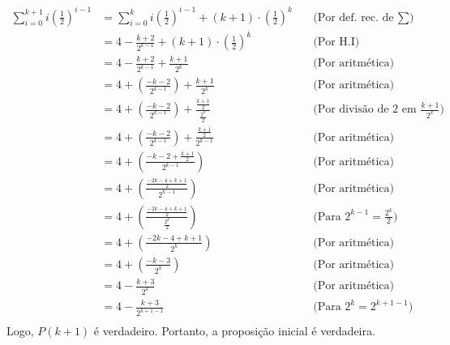 \begin{align*}
	\sum\limits_{i = 0}^{k + 1} i(\frac{1}{2})^{i - 1} & = \sum\limits_{i = 0}^k i(\frac{1}{2})^{i - 1} + (k + 1)\cdot(\frac{1}{2})^k & \quad \text{(Por def. rec. de $\sum$)}                   \\
	                                                   & = 4 - \frac{k + 2}{2^{k - 1}} + (k + 1) \cdot(\frac{1}{2})^k                 & \quad \text{(Por H.I)}                                   \\
	                                                   & = 4 - \frac{k + 2}{2^{k - 1}} + \frac{k + 1}{2^k}                            & \quad \text{(Por aritmética)}                                 \\
	                                                   & = 4 + (\frac{-k - 2}{2^{k - 1}}) + \frac{k + 1}{2^k}                         & \quad \text{(Por aritmética)}                                 \\
	                                                   & = 4 + (\frac{-k - 2}{2^{k - 1}}) + \frac{\frac{k + 1}{2}}{\frac{2^k}{2}}     & \quad \text{(Por divisão de $2$ em $\frac{k + 1}{2^k}$)} \\
	                                                   & = 4 + (\frac{-k - 2}{2^{k - 1}}) + \frac{\frac{k + 1}{2}}{2^{k - 1}}         & \quad \text{(Por aritmética)}                                 \\
	                                                   & = 4 + (\frac{-k - 2 + \frac{k + 1}{2}}{2^{k - 1}})                           & \quad \text{(Por aritmética)}                                 \\
	                                                   & = 4 + (\frac{\frac{-2k - 4 + k + 1}{2}}{2^{k - 1}})                          & \quad \text{(Por aritmética)}                                 \\
	                                                   & = 4 + (\frac{\frac{-2k - 4 + k + 1}{2}}{\frac{2^k}{2}})                      & \quad \text{(Para $2^{k - 1} = \frac{2^k}{2}$)}          \\
	                                                   & = 4 + (\frac{-2k - 4 + k + 1}{2^k})                                          & \quad \text{(Por aritmética)}                                 \\
	                                                   & = 4 + (\frac{-k - 3}{2^k})                                                   & \quad \text{(Por aritmética)}                                 \\
	                                                   & = 4 - \frac{k + 3}{2^k}                                                      & \quad \text{(Por aritmética)}                                 \\
	                                                   & = 4 - \frac{k + 3}{2^{k + 1 - 1}}                                            & \quad \text{(Para $2^k = 2^{k + 1 - 1}$)}                \\
\end{align*}
Logo, $P(k + 1)$ é verdadeiro.
Portanto, a proposição inicial é verdadeira.
